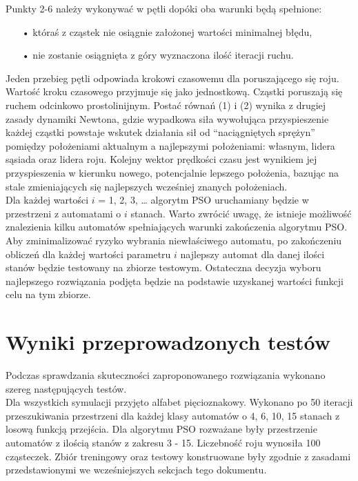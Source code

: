 \documentclass[runningheads,a4paper]{llncs}
\begin{document}
Punkty 2-6 należy wykonywać w pętli dopóki oba warunki będą spełnione:

\begin{itemize}
\item[•] któraś z cząstek nie osiągnie założonej wartości minimalnej błędu,
\item[•] nie zostanie osiągnięta z góry wyznaczona ilość iteracji ruchu.
\end{itemize}

Jeden przebieg pętli odpowiada krokowi czasowemu dla poruszającego się roju. Wartość kroku czasowego przyjmuje się jako jednostkową.
Cząstki poruszają się ruchem odcinkowo prostolinijnym. Postać równań (1) i (2) wynika z drugiej zasady dynamiki Newtona, gdzie wypadkowa siła wywołująca przyspieszenie każdej cząstki powstaje wskutek działania sił od “naciągniętych sprężyn” pomiędzy położeniami aktualnym a najlepszymi położeniami: własnym, lidera sąsiada oraz lidera roju. Kolejny wektor prędkości czasu jest wynikiem jej przyspieszenia w kierunku nowego, potencjalnie lepszego położenia, bazując na stale zmieniających się najlepszych wcześniej znanych położeniach.\\

Dla każdej wartości $i$ = 1, 2, 3, …  algorytm PSO uruchamiany będzie w przestrzeni z automatami o $i$ stanach. Warto zwrócić uwagę, że istnieje możliwość znalezienia kilku automatów spełniających warunki zakończenia algorytmu PSO. Aby zminimalizować ryzyko wybrania niewłaściwego automatu, po zakończeniu obliczeń dla każdej wartości parametru $i$ najlepszy automat dla danej ilości stanów będzie testowany na zbiorze testowym. Ostateczna decyzja wyboru najlepszego rozwiązania podjęta będzie na podstawie uzyskanej wartości funkcji celu na tym zbiorze.

\newpage

\FloatBarrier
\section{Wyniki przeprowadzonych testów}

Podczas sprawdzania skuteczności zaproponowanego rozwiązania wykonano szereg następujących testów. \\

Dla wszystkich symulacji przyjęto alfabet pięcioznakowy. Wykonano po 50 iteracji przeszukiwania przestrzeni dla każdej klasy automatów o 4, 6, 10, 15 stanach z losową funkcją przejścia. Dla algorytmu PSO rozważane były przestrzenie automatów z ilością stanów z zakresu 3 - 15. Liczebność roju wynosiła 100 cząsteczek. Zbiór treningowy oraz testowy konstruowane były zgodnie z zasadami przedstawionymi we wcześniejszych sekcjach tego dokumentu. \\
\end{document}
